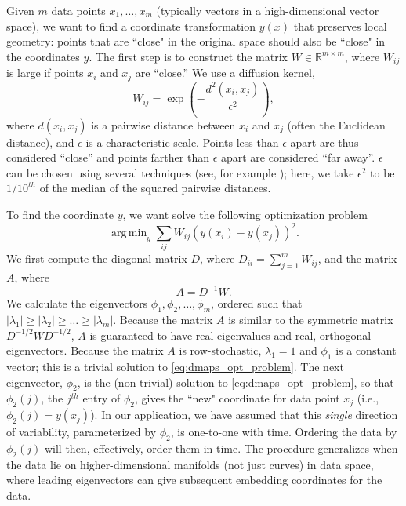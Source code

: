 \documentclass{pnastwo}
\DeclareMathOperator*{\argmin}{arg\,min}
\begin{document}
\begin{article}
Given $m$ data points $x_1, \dots, x_m$ (typically vectors in a high-dimensional vector space), we want to find a coordinate transformation $y(x)$ that preserves local geometry: points that are ``close" in the original space should also be ``close" in the coordinates $y$.
%
The first step is to construct the matrix $W \in \mathbb{R}^{m \times m}$, where $W_{ij}$ is large if points $x_i$ and $x_j$ are ``close.''
%
We use a diffusion kernel,
\begin{equation} \label{eq:dmaps_W}
W_{ij} = \exp \left( -\frac{d^2(x_i, x_j)}{\epsilon^2} \right),
\end{equation}
where $d(x_i, x_j)$ is a pairwise distance between $x_i$ and $x_j$ (often the Euclidean distance), and $\epsilon$ is a characteristic scale.
%
Points less than $\epsilon$ apart are thus considered ``close'' and points farther than $\epsilon$ apart are considered ``far away''.
%
$\epsilon$ can be chosen using several techniques (see, for example \cite{coifman2008graph, rohrdanz2011determination}); here, we take $\epsilon^2$ to be $1/10^{th}$ of the median of the squared pairwise distances.

To find the coordinate $y$, we want solve the following optimization problem \cite{Belkin2003}
\begin{equation} \label{eq:dmaps_opt_problem}
\argmin_{y} \sum_{ij} W_{ij} (y(x_i) - y(x_j))^2.
\end{equation}
%
We first compute the diagonal matrix $D$, where $D_{ii} = \sum_{j=1}^{m} W_{ij}$, and the matrix $A$, where
\begin{equation} \label{eq:dmaps_A}
A = D^{-1} W.
\end{equation}
%
We calculate the eigenvectors $\phi_1, \phi_2, \dots, \phi_m$, ordered such that $|\lambda_1| \ge |\lambda_2| \ge \dots \ge |\lambda_m|$.
%
Because the matrix $A$ is similar to the symmetric matrix $D^{-1/2} W D^{-1/2}$, $A$ is guaranteed to have real eigenvalues and real, orthogonal eigenvectors.
%
Because the matrix $A$ is row-stochastic, $\lambda_1=1$ and $\phi_1$ is a constant vector; this is a trivial solution to \eqref{eq:dmaps_opt_problem}.
%
%
The next eigenvector, $\phi_2$, is the (non-trivial) solution to \eqref{eq:dmaps_opt_problem}, so that $\phi_2(j)$, the $j^{th}$ entry of $\phi_2$, gives the ``new" coordinate for data point $x_j$ (i.e., $\phi_2(j) = y(x_j)$).
%
In our application, we have assumed that this {\em single} direction of variability, parameterized by $\phi_2$, is one-to-one with time.
%
Ordering the data by $\phi_2(j)$ will then, effectively, order them in time.
%
The procedure generalizes when the data lie on higher-dimensional manifolds (not just curves) in data space, where leading eigenvectors can give subsequent embedding coordinates for the data.
%


\end{article}
\end{document}
